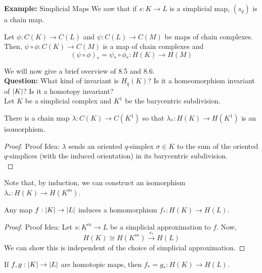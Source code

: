 \begin{example}{\textbf{Example:} Simplicial Maps}
    We saw that if $s : K \to L$ is a simplicial map, $(s_q)$ is a chain map.
\end{example}

\begin{lemma}
    Let $\phi : C(K) \to C(L)$ and $\psi : C(L) \to C(M)$ be maps of chain complexes. Then, $\psi \circ \phi : C(K) \to C(M)$ is a map of chain complexes and
    \[ (\psi \circ \phi)_* = \psi_* \circ \phi_* : H(K) \to H(M) \]
\end{lemma}

We will now give a brief overview of 8.5 and 8.6.\\

\textbf{Question:} What kind of invariant is $H_q(K)$? Is it a homeomorphism invariant of $\left\lvert {K} \right\rvert$? Is it a homotopy invariant?\\

Let $K$ be a simplicial complex and $K^1$ be the barycentric subdivision.

\begin{theorem}
    There is a chain map $\lambda : C(K) \to C(K^1)$ so that $\lambda_* : H(K) \to H(K^1)$ is an isomorphism.
\end{theorem}
\begin{proof}{Proof Idea:}
    $\lambda$ sends an oriented $q$-simplex $\sigma \in K$ to the sum of the oriented $q$-simplices (with the induced orientation) in its barycentric subdivision.\\

    
\end{proof}

Note that, by induction, we can construct an isomorphism $\lambda_* : H(K) \to H(K^{m})$.

\begin{theorem}
    Any map $f : \left\lvert {K} \right\rvert \to \left\lvert {L} \right\rvert$ induces a homomorphism $f_* : H(K) \to H(L)$.
\end{theorem}
\begin{proof}{Proof Idea:}
    Let $s : K^{m} \to L$ be a simplicial approximation to $f$. Now,
    \[ H(K) \cong H(K^{m}) \xrightarrow{s_*} H(L) \]
    We can show this is independent of the choice of simplicial approximation.
\end{proof}

\begin{theorem}
    If $f, g : \left\lvert {K} \right\rvert \to \left\lvert {L} \right\rvert$ are homotopic maps, then $f_* = g_* : H(K) \to H(L)$.
\end{theorem}

